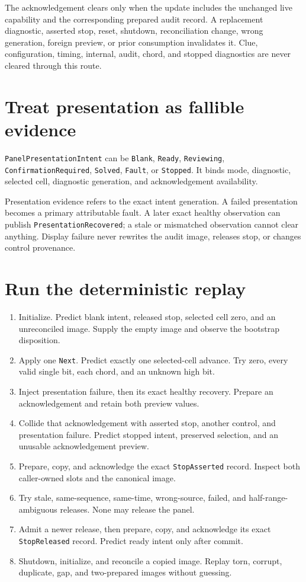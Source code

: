 \documentclass[10pt]{article}
\begin{document}
The acknowledgement clears only when the update includes the unchanged live
capability and the corresponding prepared audit record. A replacement
diagnostic, asserted stop, reset, shutdown, reconciliation change, wrong
generation, foreign preview, or prior consumption invalidates it. Clue,
configuration, timing, internal, audit, chord, and stopped diagnostics are
never cleared through this route.

\section{Treat presentation as fallible evidence}
\texttt{PanelPresentationIntent} can be \texttt{Blank}, \texttt{Ready},
\texttt{Reviewing}, \texttt{ConfirmationRequired}, \texttt{Solved},
\texttt{Fault}, or \texttt{Stopped}. It binds mode, diagnostic, selected cell,
diagnostic generation, and acknowledgement availability.

Presentation evidence refers to the exact intent generation. A failed
presentation becomes a primary attributable fault. A later exact healthy
observation can publish \texttt{PresentationRecovered}; a stale or mismatched
observation cannot clear anything. Display failure never rewrites the audit
image, releases stop, or changes control provenance.

\section{Run the deterministic replay}
\begin{enumerate}
 \item Initialize. Predict blank intent, released stop, selected cell zero,
       and an unreconciled image. Supply the empty image and observe the
       bootstrap disposition.
 \item Apply one \texttt{Next}. Predict exactly one selected-cell advance.
       Try zero, every valid single bit, each chord, and an unknown high bit.
 \item Inject presentation failure, then its exact healthy recovery. Prepare
       an acknowledgement and retain both preview values.
 \item Collide that acknowledgement with asserted stop, another control, and
       presentation failure. Predict stopped intent, preserved selection, and
       an unusable acknowledgement preview.
 \item Prepare, copy, and acknowledge the exact \texttt{StopAsserted} record.
       Inspect both caller-owned slots and the canonical image.
 \item Try stale, same-sequence, same-time, wrong-source, failed, and
       half-range-ambiguous releases. None may release the panel.
 \item Admit a newer release, then prepare, copy, and acknowledge its exact
       \texttt{StopReleased} record. Predict ready intent only after commit.
 \item Shutdown, initialize, and reconcile a copied image. Replay torn,
       corrupt, duplicate, gap, and two-prepared images without guessing.
\end{enumerate}
\end{document}
